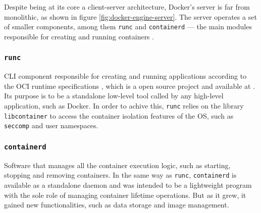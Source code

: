 Despite being at its core a client-server architecture, Docker's server is far from monolithic, as shown in figure \ref{fig:docker-engine-server}. The server operates a set of smaller components, among them \texttt{runc} and \texttt{containerd} --- the main modules responsible for creating and running containers \cite{Kane2018-fn}.

\subsubsection{\texttt{runc}}
\ac{CLI} component responsible for creating and running applications according to the \ac{OCI} runtime specifications \cite{oci-runc}, which is a open source project and available at \cite{git-runc}. Its purpose is to be a standalone low-level tool called by any high-level application, such as Docker. In order to achive this, \texttt{runc} relies on the library \texttt{libcontainer} to access the container isolation features of the \ac{OS}, such as \texttt{seccomp} and user namespaces\cite{runc-estes}.

\subsubsection{\texttt{containerd}}
Software that manages all the container execution logic, such as starting, stopping and removing containers. In the same way as \texttt{runc}, \texttt{containerd} is available as a standalone daemon and was intended to be a lightweight program with the sole role of managing container lifetime operations. But as it grew, it gained new functionalities, such as data storage and image management. \cite{docker-containerd}


